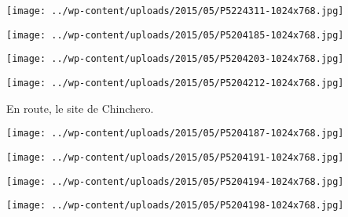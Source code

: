  

\begin{center} \texttt{[image: ../wp-content/uploads/2015/05/P5224311-1024x768.jpg]} \end{center}

 

 

\begin{center} \texttt{[image: ../wp-content/uploads/2015/05/P5204185-1024x768.jpg]} \end{center}

 

 

\begin{center} \texttt{[image: ../wp-content/uploads/2015/05/P5204203-1024x768.jpg]} \end{center}

 

 

\begin{center} \texttt{[image: ../wp-content/uploads/2015/05/P5204212-1024x768.jpg]} \end{center}

 

 En route, le site de Chinchero. 

 

\begin{center} \texttt{[image: ../wp-content/uploads/2015/05/P5204187-1024x768.jpg]} \end{center}

 

 

\begin{center} \texttt{[image: ../wp-content/uploads/2015/05/P5204191-1024x768.jpg]} \end{center}

 

 

\begin{center} \texttt{[image: ../wp-content/uploads/2015/05/P5204194-1024x768.jpg]} \end{center}

 

 

\begin{center} \texttt{[image: ../wp-content/uploads/2015/05/P5204198-1024x768.jpg]} \end{center}


